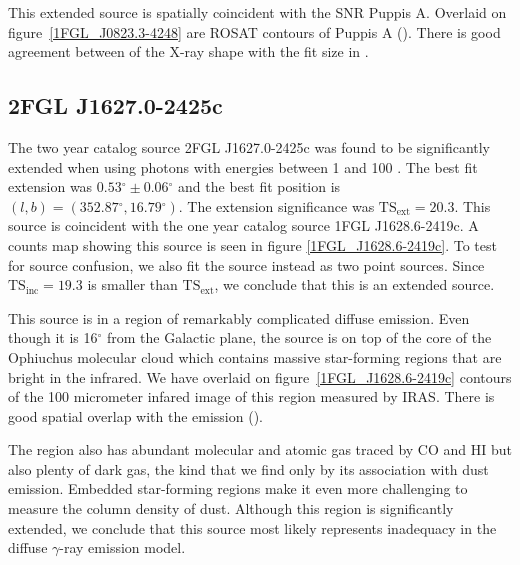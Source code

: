 \documentclass[12pt,preprint]{aastex}
\newcommand{\gev}{\text{GeV}\xspace}
\newcommand{\tsext}{{\ensuremath{\text{TS}_\text{ext}}}\xspace}
\newcommand{\tsinc}{\ensuremath{\text{TS}_\text{inc}}\xspace}
\renewcommand{\deg}{\ensuremath{^\circ}\xspace}
\begin{document}
This extended source is spatially coincident with the SNR Puppis A.
Overlaid on figure~\ref{1FGL_J0823.3-4248} are ROSAT contours of Puppis
A (\cite{rosat_puppis_a}). There is good agreement between of the X-ray
shape with the fit size in \gev.


\subsection{2FGL J1627.0-2425c}
\label{section_2FGL_J1627.0-2425c}


The two year catalog source 2FGL J1627.0-2425c was found to be
significantly extended when using photons with energies between 1 \gev
and 100 \gev.  The best fit extension was $0.53\deg\pm0.06\deg$ and the
best fit position is $(l,b)=(352.87\deg, 16.79\deg)$.
The extension significance was $\tsext=20.3$. 
This source is coincident with the one year catalog source 1FGL J1628.6-2419c.
A counts map showing this source is
seen in figure \ref{1FGL_J1628.6-2419c}.  To test for source confusion,
we also fit the source instead as two point sources. Since $\tsinc=19.3$
is smaller than \tsext, we conclude that this is an extended source.

This source is in a region of remarkably complicated diffuse emission.
Even though it is 16\deg from the Galactic plane, the source is on top
of the core of the Ophiuchus molecular cloud which contains massive
star-forming regions that are bright in the infrared.  We have overlaid
on figure~\ref{1FGL_J1628.6-2419c} contours of the 100 micrometer infared
image of this region measured by IRAS. There is good spatial overlap
with the \gev emission (\cite{iras_rho_ophiuci}).

The region also has abundant molecular and atomic gas traced by CO
and HI but also plenty of dark gas, the kind that we find only by its
association with dust emission. Embedded star-forming regions make it even
more challenging to measure the column density of dust.  Although this
region is significantly extended, we conclude that this source most
likely represents inadequacy in the diffuse $\gamma$-ray emission model.

\end{document}

